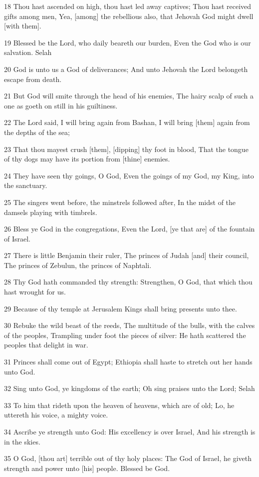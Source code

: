 \par 18 Thou hast ascended on high, thou hast led away captives; Thou hast received gifts among men, Yea, [among] the rebellious also, that Jehovah God might dwell [with them].
\par 19 Blessed be the Lord, who daily beareth our burden, Even the God who is our salvation. Selah
\par 20 God is unto us a God of deliverances; And unto Jehovah the Lord belongeth escape from death.
\par 21 But God will smite through the head of his enemies, The hairy scalp of such a one as goeth on still in his guiltiness.
\par 22 The Lord said, I will bring again from Bashan, I will bring [them] again from the depths of the sea;
\par 23 That thou mayest crush [them], [dipping] thy foot in blood, That the tongue of thy dogs may have its portion from [thine] enemies.
\par 24 They have seen thy goings, O God, Even the goings of my God, my King, into the sanctuary.
\par 25 The singers went before, the minstrels followed after, In the midst of the damsels playing with timbrels.
\par 26 Bless ye God in the congregations, Even the Lord, [ye that are] of the fountain of Israel.
\par 27 There is little Benjamin their ruler, The princes of Judah [and] their council, The princes of Zebulun, the princes of Naphtali.
\par 28 Thy God hath commanded thy strength: Strengthen, O God, that which thou hast wrought for us.
\par 29 Because of thy temple at Jerusalem Kings shall bring presents unto thee.
\par 30 Rebuke the wild beast of the reeds, The multitude of the bulls, with the calves of the peoples, Trampling under foot the pieces of silver: He hath scattered the peoples that delight in war.
\par 31 Princes shall come out of Egypt; Ethiopia shall haste to stretch out her hands unto God.
\par 32 Sing unto God, ye kingdoms of the earth; Oh sing praises unto the Lord; Selah
\par 33 To him that rideth upon the heaven of heavens, which are of old; Lo, he uttereth his voice, a mighty voice.
\par 34 Ascribe ye strength unto God: His excellency is over Israel, And his strength is in the skies.
\par 35 O God, [thou art] terrible out of thy holy places: The God of Israel, he giveth strength and power unto [his] people. Blessed be God.

